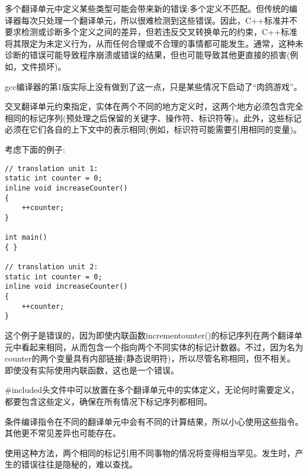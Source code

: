 
多个翻译单元中定义某些类型可能会带来新的错误:多个定义不匹配。但传统的编译器每次只处理一个翻译单元，所以很难检测到这些错误。因此，C++标准并不要求检测或诊断多个定义之间的差异，但若违反交叉转换单元的约束，C++标准将其限定为未定义行为，从而任何合理或不合理的事情都可能发生。通常，这种未诊断的错误可能导致程序崩溃或错误的结果，但也可能导致其他更直接的损害(例如，文件损坏)。

\begin{tcolorbox}[colback=webgreen!5!white,colframe=webgreen!75!black]
\hspace*{0.75cm}gcc编译器的第1版实际上没有做到了这一点，只是某些情况下启动了“肉鸽游戏”。
\end{tcolorbox}

交叉翻译单元约束指定，实体在两个不同的地方定义时，这两个地方必须包含完全相同的标记序列(预处理之后保留的关键字、操作符、标识符等)。此外，这些标记必须在它们各自的上下文中的表示相同(例如，标识符可能需要引用相同的变量)。

考虑下面的例子:

\begin{lstlisting}[style=styleCXX]
// translation unit 1:
static int counter = 0;
inline void increaseCounter()
{
	++counter;
}

int main()
{ }

// translation unit 2:
static int counter = 0;
inline void increaseCounter()
{
	++counter;
}
\end{lstlisting}

这个例子是错误的，因为即使内联函数incrementounter()的标记序列在两个翻译单元中看起来相同，从而包含一个指向两个不同实体的标记计数器。不过，因为名为counter的两个变量具有内部链接(静态说明符)，所以尽管名称相同，但不相关。即使没有实际使用内联函数，这也是一个错误。

\#included头文件中可以放置在多个翻译单元中的实体定义，无论何时需要定义，都要包含这些定义，确保在所有情况下标记序列都相同。

\begin{tcolorbox}[colback=webgreen!5!white,colframe=webgreen!75!black]
\hspace*{0.75cm}条件编译指令在不同的翻译单元中会有不同的计算结果，所以小心使用这些指令。其他更不常见差异也可能存在。
\end{tcolorbox}

使用这种方法，两个相同的标记引用不同事物的情况将变得相当罕见。发生时，产生的错误往往是隐秘的，难以查找。

